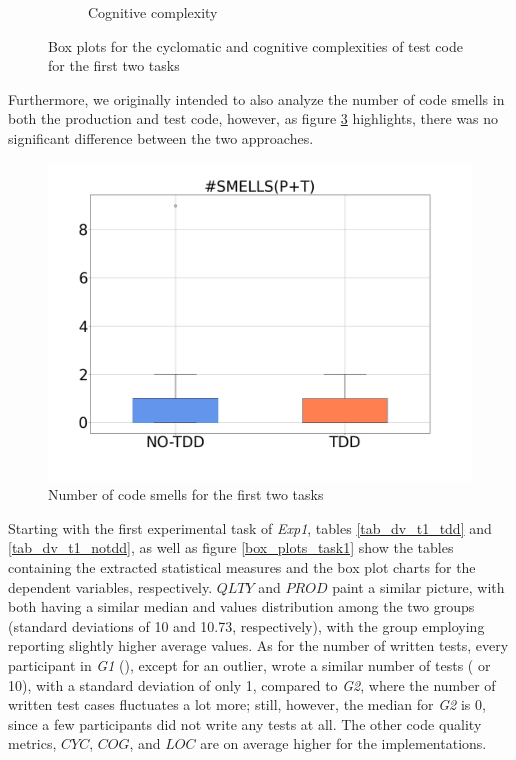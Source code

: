 \begin{figure}[htbp]
\begin{subfigure}{0.5\textwidth}
        \caption{Cognitive complexity}
        \label{bp_task1_2_cog_test}
    \end{subfigure}
    \caption{Box plots for the cyclomatic and cognitive complexities of test code for the first two tasks}
    \label{bp_task1_2_cyc_cog_test}
\end{figure}

Furthermore, we originally intended to also analyze the number of code smells in both the production and test code, however, as figure \ref{bp_task1_2_smells} highlights, there was no significant difference between the two approaches.

\begin{figure}[h]
    \centering
    \includegraphics[width=0.5\linewidth, scale=0.5]{figures/box_plots/SMELLS.png}
    \caption{Number of code smells for the first two tasks}
    \label{bp_task1_2_smells}
\end{figure}


Starting with the first experimental task of \textit{Exp1}, tables \ref{tab_dv_t1_tdd} and \ref{tab_dv_t1_notdd}, as well as figure \ref{box_plots_task1} show the tables containing the extracted statistical measures and the box plot charts for the dependent variables, respectively.
$QLTY$ and $PROD$ paint a similar picture, with both having a similar median and values distribution among the two groups (standard deviations of 10 and 10.73, respectively), with the group employing \tdd reporting slightly higher average values.
As for the number of written tests, every participant in \textit{G1} (\tdd), except for an outlier, wrote a similar number of tests ( or 10), with a standard deviation of only 1, compared to \textit{G2}, where the number of written test cases fluctuates a lot more; still, however, the median for \textit{G2} is 0, since a few participants did not write any tests at all.
The other code quality metrics, $CYC$, $COG$, and $LOC$ are on average higher for the \tdd implementations.

